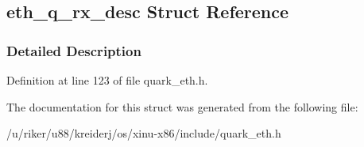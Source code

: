 \hypertarget{structeth__q__rx__desc}{}\subsection{eth\+\_\+q\+\_\+rx\+\_\+desc Struct Reference}
\label{structeth__q__rx__desc}


\subsubsection{Detailed Description}


Definition at line 123 of file quark\+\_\+eth.\+h.



The documentation for this struct was generated from the following file\+:\begin{DoxyCompactItemize}
\item 
/u/riker/u88/kreiderj/os/xinu-\/x86/include/quark\+\_\+eth.\+h\end{DoxyCompactItemize}
